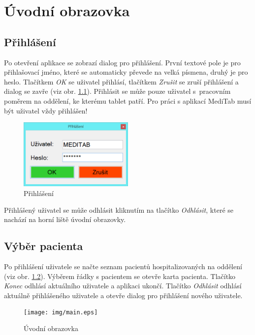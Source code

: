 \setlength{\parskip}{1em}

\chapter{Úvodní obrazovka}

\section{Přihlášení}

Po otevření aplikace se zobrazí dialog pro přihlášení. První textové pole je pro přihlašovací jméno, které se automaticky převede na velká písmena, druhý je pro heslo. Tlačítkem \emph{OK} se uživatel přihlásí, tlačítkem \emph{Zrušit} se zruší přihlášení a dialog se zavře (viz obr. \ref{fig:login}). Přihlásit se může pouze uživatel s~pracovním poměrem na oddělení, ke kterému tablet patří. Pro práci s aplikací MediTab musí být uživatel vždy přihlášen!

\begin{figure}[H]
	\centering
	\includegraphics[width=0.5\textwidth]{img/login.eps}
	\caption{Přihlášení}
  \label{fig:login}
\end{figure}

Přihlášený uživatel se může odhlásit kliknutím na tlačítko \emph{Odhlásit}, které se nachází na horní liště úvodní obrazovky.

\section{Výběr pacienta}

Po přihlášení uživatele se načte seznam pacientů hospitalizovaných na oddělení (viz obr. \ref{fig:main}). Výběrem řádky s pacientem se otevře karta pacienta.
Tlačítko \emph{Konec} odhlásí aktuálního uživatele a aplikaci ukončí. Tlačítko \emph{Odhlásit} odhlásí aktuálně přihlášeného uživatele a otevře dialog pro přihlášení nového uživatele.

\begin{figure}[H]
	\centering
	\texttt{[image: img/main.eps]}
	\caption{Úvodní obrazovka}
  \label{fig:main}
\end{figure}

